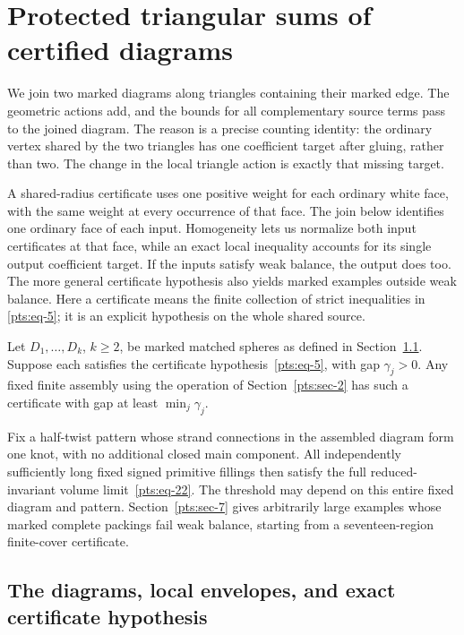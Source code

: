 \chapter{Protected triangular sums of certified diagrams}
\label{app:protected-triangular-sums}

We join two marked diagrams along triangles containing their marked
edge. The geometric actions add, and the bounds for all complementary
source terms pass to the joined diagram. The reason is a precise
counting identity: the ordinary vertex shared by the two triangles has
one coefficient target after gluing, rather than two. The change in the
local triangle action is exactly that missing target.

A shared-radius certificate uses one positive weight for each ordinary
white face, with the same weight at every occurrence of that face.
The join below identifies one ordinary face of each input. Homogeneity
lets us normalize both input certificates at that face, while an exact
local inequality accounts for its single output coefficient target.
If the inputs satisfy weak balance, the output does too. The more
general certificate hypothesis also yields marked examples outside
weak balance. Here a certificate means the finite collection of strict
inequalities in \eqref{pts:eq-5}; it is an explicit hypothesis on the
whole shared source.

\begin{theorem}\label{pts:closure}
Let $D_1,\ldots,D_k$, $k\ge2$, be marked matched spheres as defined in
Section~\ref{pts:sec-1}. Suppose each satisfies the certificate
hypothesis~\eqref{pts:eq-5}, with gap $\gamma_j>0$. Any fixed finite
assembly using the operation of Section~\ref{pts:sec-2} has such a
certificate with gap at least $\min_j\gamma_j$.

Fix a half-twist pattern whose strand connections in the assembled
diagram form one knot, with no additional closed main component.
All independently sufficiently long fixed signed primitive fillings
then satisfy the full reduced-invariant volume limit~\eqref{pts:eq-22}.
The threshold may depend on this entire fixed diagram and pattern.
Section~\ref{pts:sec-7} gives arbitrarily large examples whose marked
complete packings fail weak balance, starting from a seventeen-region
finite-cover certificate.
\end{theorem}

\section{The diagrams, local envelopes, and exact certificate
hypothesis}\label{pts:sec-1}

